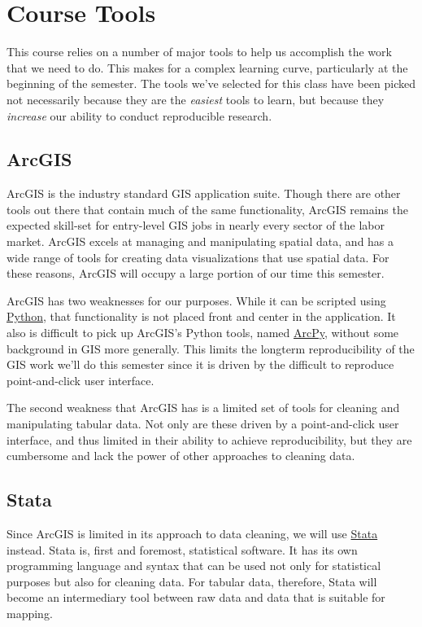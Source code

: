 \documentclass[]{book}
\theoremstyle{definition}
\theoremstyle{definition}
\theoremstyle{remark}
\begin{document}
\section{Course Tools}\label{course-tools}

This course relies on a number of major tools to help us accomplish the
work that we need to do. This makes for a complex learning curve,
particularly at the beginning of the semester. The tools we've selected
for this class have been picked not necessarily because they are the
\emph{easiest} tools to learn, but because they \emph{increase} our
ability to conduct reproducible research.

\subsection{ArcGIS}\label{arcgis}

ArcGIS is the industry standard GIS application suite. Though there are
other tools out there that contain much of the same functionality,
ArcGIS remains the expected skill-set for entry-level GIS jobs in nearly
every sector of the labor market. ArcGIS excels at managing and
manipulating spatial data, and has a wide range of tools for creating
data visualizations that use spatial data. For these reasons, ArcGIS
will occupy a large portion of our time this semester.

ArcGIS has two weaknesses for our purposes. While it can be scripted
using \href{https://www.python.org}{Python}, that functionality is not
placed front and center in the application. It also is difficult to pick
up ArcGIS's Python tools, named
\href{http://pro.arcgis.com/en/pro-app/arcpy/get-started/what-is-arcpy-.htm}{ArcPy},
without some background in GIS more generally. This limits the longterm
reproducibility of the GIS work we'll do this semester since it is
driven by the difficult to reproduce point-and-click user interface.

The second weakness that ArcGIS has is a limited set of tools for
cleaning and manipulating tabular data. Not only are these driven by a
point-and-click user interface, and thus limited in their ability to
achieve reproducibility, but they are cumbersome and lack the power of
other approaches to cleaning data.

\subsection{Stata}\label{stata}

Since ArcGIS is limited in its approach to data cleaning, we will use
\href{http://stata.com}{Stata} instead. Stata is, first and foremost,
statistical software. It has its own programming language and syntax
that can be used not only for statistical purposes but also for cleaning
data. For tabular data, therefore, Stata will become an intermediary
tool between raw data and data that is suitable for mapping.
\end{document}
